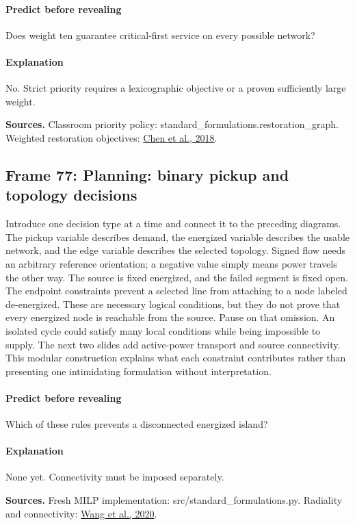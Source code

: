 \documentclass[11pt]{article}
\begin{document}
\paragraph{Predict before revealing}Does weight ten guarantee critical-first service on every possible network?
\paragraph{Explanation}No. Strict priority requires a lexicographic objective or a proven sufficiently large weight.
\par\nopagebreak\begin{minipage}{\linewidth}{\footnotesize\color{slate}\textbf{Sources.} Classroom priority policy: standard\_formulations.restoration\_graph. Weighted restoration objectives: \href{https://doi.org/10.1109/TPWRS.2017.2720122}{Chen et al., 2018}.\par}\end{minipage}\par\medskip
\subsection*{Frame 77: Planning: binary pickup and topology decisions}
Introduce one decision type at a time and connect it to the preceding diagrams. The pickup variable describes demand, the energized variable describes the usable network, and the edge variable describes the selected topology. Signed flow needs an arbitrary reference orientation; a negative value simply means power travels the other way. The source is fixed energized, and the failed segment is fixed open. The endpoint constraints prevent a selected line from attaching to a node labeled de-energized. These are necessary logical conditions, but they do not prove that every energized node is reachable from the source. Pause on that omission. An isolated cycle could satisfy many local conditions while being impossible to supply. The next two slides add active-power transport and source connectivity. This modular construction explains what each constraint contributes rather than presenting one intimidating formulation without interpretation.\par
\paragraph{Predict before revealing}Which of these rules prevents a disconnected energized island?
\paragraph{Explanation}None yet. Connectivity must be imposed separately.
\par\nopagebreak\begin{minipage}{\linewidth}{\footnotesize\color{slate}\textbf{Sources.} Fresh MILP implementation: src/standard\_formulations.py. Radiality and connectivity: \href{https://arxiv.org/abs/1912.05185}{Wang et al., 2020}.\par}\end{minipage}\par\medskip
\end{document}
